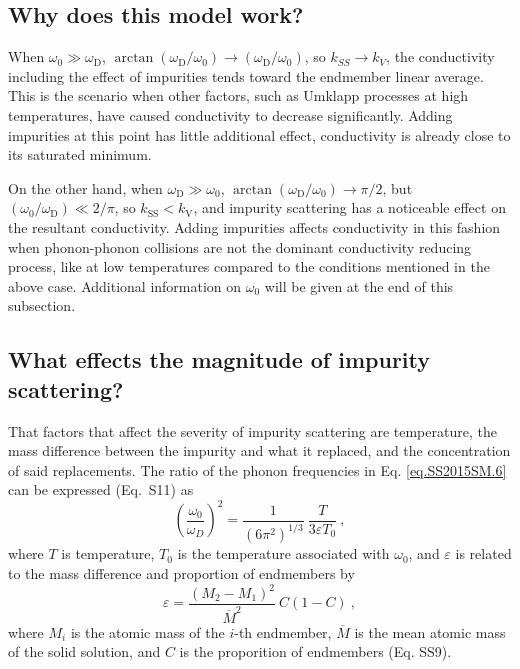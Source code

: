 \subsection{Why does this model work?} 

When $\omega_{\mathrm{0}} \gg \omega_{\mathrm{D}}$, $\arctan(\omega_{\mathrm{D}}/\omega_{\mathrm{0}}) \rightarrow (\omega_{\mathrm{D}}/\omega_{\mathrm{0}})$, so $k_{SS} \rightarrow k_{V}$, the conductivity including the effect of impurities tends toward the endmember linear average. This is the scenario when other factors, such as Umklapp processes at high temperatures, have caused conductivity to decrease significantly. Adding impurities at this point has little additional effect, conductivity is already close to its saturated minimum.

On the other hand, when $\omega_{\mathrm{D}}\gg\omega_{\mathrm{0}}$, $\arctan(\omega_{\mathrm{D}}/\omega_{\mathrm{0}})\rightarrow\pi/2$, but $(\omega_{\mathrm{0}}/\omega_{\mathrm{D}})\ll 2/\pi$, so $k_{\mathrm{SS}} < k_{\mathrm{V}}$, and impurity scattering has a noticeable effect on the resultant conductivity. Adding impurities affects conductivity in this fashion when phonon-phonon collisions are not the dominant conductivity reducing process, like at low temperatures compared to the conditions mentioned in the above case. Additional information on $\omega_{\mathrm{0}}$ will be given at the end of this subsection.

\subsection{What effects the magnitude of impurity scattering?} 

That factors that affect the severity of impurity scattering are temperature, the mass difference between the impurity and what it replaced, and the concentration of said replacements. The ratio of the phonon frequencies in Eq. \ref{eq.SS2015SM.6} can be expressed (Eq.~S11) as
%
\begin{equation}
\left ( \frac{\omega_{0}}{\omega_{D}} \right )^{2} = \frac{1}{\left ( 6\pi^{2} \right )^{1/3}} \ \frac{T}{3 \varepsilon T_{0}} \ ,
\label{eq.SS2015SM.11}
\end{equation}
%
where $T$ is temperature, $T_{\mathrm{0}}$ is the temperature associated with $\omega_{0}$, and $\varepsilon$ is related to the mass difference and proportion of endmembers by
%
\begin{equation}
\varepsilon = \frac{\left (M_{2}-M_{1}  \right )^{2}}{\overline{M}^{2}} \ C\left ( 1-C \right ) \ ,
\label{eq.SS2015SM.9}
\end{equation}
%
where $M_{i}$ is the atomic mass of the $i$-th endmember, $\overline{M}$ is the mean atomic mass of the solid solution, and $C$ is the proporition of endmembers (Eq. SS9).

